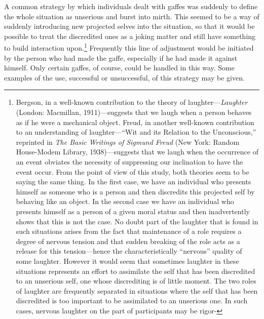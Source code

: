 \documentclass[twoside,symmetric,nobib,justified]{tufte-book}
\begin{document}
\noindent A common strategy by which individuals dealt with gaffes was suddenly to
define the whole situation as unserious and burst into mirth. This
seemed to be a way of suddenly introducing new projected selves into the
situation, so that it would be possible to treat the discredited ones as
a joking matter and still have something to build interaction
upon.\footnote{Bergson, in a well-known contribution to the theory of
  laughter---\emph{Laughter} (London: Macmillan, 1911)---suggests that
  we laugh when a person behaves as if he were a mechanical object.
  Freud, in another well-known contribution to an understanding of
  laughter---``Wit and its Relation to the Unconscious,'' reprinted in
  \emph{The Basic Writings of Sigmund Freud} (New York: Random
  House-Modem Library, 1938)---suggests that we laugh when the
  occurrence of an event obviates the necessity of suppressing our
  inclination to have the event occur. From the point of view of this
  study, both theories seem to be saying the same thing. In the first
  case, we have an individual who presents himself as someone who is a
  person and then discredits this projected self by behaving like an
  object. In the second case we have an individual who presents himself
  as a person of a given moral status and then inadvertently shows that
  this is not the case. No doubt part of the laughter that is found in
  such situations arises from the fact that maintenance of a role
  requires a degree of nervous tension and that sudden breaking of the
  role acts as a release for this tension---hence the characteristically
  ``nervous'' quality of some laughter. However it would seem that
  sometimes laughter in these situations represents an effort to
  assimilate the self that has been discredited to an unserious self,
  one whose discrediting is of little moment. The two roles of laughter
  are frequently separated in situations where the self that has been
  discredited is too important to be assimilated to an unserious one. In
  such cases, nervous laughter on the part of participants may be
  rigor-} Frequently this line of adjustment would be
initiated by the person who had made the gaffe, especially if he had
made it against himself. Only certain gaffes, of course, could be
handled in this way. Some examples of the use, successful or
unsuccessful, of this strategy may be given.
\end{document}
